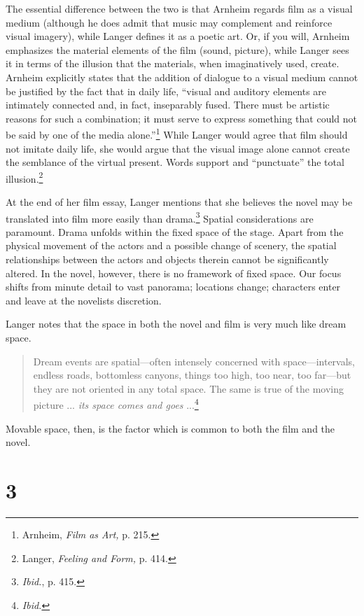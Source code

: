 \documentclass{tufte-handout}
\begin{document}
The essential difference between the two is that Arnheim regards film as
a visual medium (although he does admit that music may complement and
reinforce visual imagery), while Langer defines it as a poetic art. Or,
if you will, Arnheim emphasizes the material elements of the film
(sound, picture), while Langer sees it in terms of the illusion that the
materials, when imaginatively used, create. Arnheim explicitly states
that the addi­tion of dialogue to a visual medium cannot be justified by
the fact that in daily life, ``visual and auditory elements are
intimately connected and, in fact, inseparably fused. There must be
artistic reasons for such a combina­tion; it must serve to express
something that could not be said by one of the media alone.''\footnote{Arnheim,
  \emph{Film as Art,} p. 215.} While Langer would agree that film should
not imitate daily life, she would argue that the visual image alone
cannot create the semblance of the virtual present. Words support and
``punctuate'' the total illusion.\footnote{Langer, \emph{Feeling and
  Form,} p. 414.}

At the end of her film essay, Langer mentions that she believes the
novel may be translated into film more easily than drama.\footnote{\emph{Ibid.},
  p. 415.} Spatial considerations are paramount. Drama unfolds within
the fixed space of the stage. Apart from the physical movement of the
actors and a possible change of scenery, the spatial relationships
between the actors and objects therein cannot be significantly altered.
In the novel, however, there is no framework of fixed space. Our focus
shifts from minute detail to vast panorama; locations change; characters
enter and leave at the novelist\textquotesingle s discretion.

Langer notes that the space in both the novel and film is very much like
dream space.

\begin{quote}
Dream events are spatial---often intensely concerned with
space---intervals, endless roads, bottomless canyons, things too high,
too near, too far---but they are not oriented in any total space. The
same is true of the moving picture ... \emph{its space comes and goes}
...\footnote{\emph{Ibid.}}
\end{quote}

\noindent Movable space, then, is the factor which is common to both the film and
the novel.

\hypertarget{3}{%
\section{\textbf{3}}\label{3}}
\end{document}
